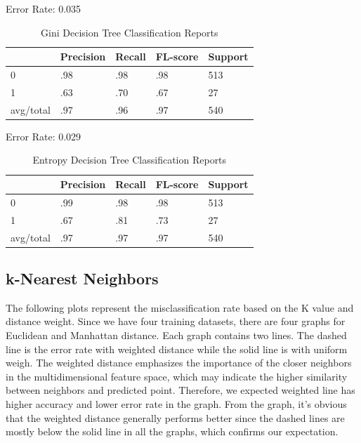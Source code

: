 \documentclass{article}
\begin{document}
\begin{table}[hbt!]
  \caption{Gini Decision Tree Classification Reports}
  Error Rate: 0.035
  \label{DT_Gini}
  \centering
  
  \begin{tabular}{lllll}
    \toprule
     & Precision & Recall & FL-score & Support\\
    \midrule
    0 & .98 & .98 & .98 & 513 \\
    1 & .63 & .70 & .67 & 27 \\
    avg/total & .97 & .96 & .97 & 540 \\
    \bottomrule
  \end{tabular}
\end{table}

\begin{table}[hbt!]
  \caption{Entropy Decision Tree Classification Reports}
  Error Rate: 0.029
  \label{DT_Entropy}
  \centering
  
  \begin{tabular}{lllll}
    \toprule
     & Precision & Recall & FL-score & Support\\
    \midrule
    0 & .99 & .98 & .98 & 513 \\
    1 & .67 & .81 & .73 & 27 \\
    avg/total & .97 & .97 & .97 & 540 \\
    \bottomrule
  \end{tabular}
\end{table}


\subsection{k-Nearest Neighbors}
The following plots represent the misclassification rate based on the K value and distance weight. Since we have four training datasets, there are four graphs for Euclidean and Manhattan distance. Each graph contains two lines. The dashed line is the error rate with weighted distance while the solid line is with uniform weigh. The weighted distance emphasizes the importance of the closer neighbors in the multidimensional feature space, which may indicate the higher similarity between neighbors and predicted point. Therefore, we expected weighted line has higher accuracy and lower error rate in the graph. From the graph, it’s obvious that the weighted distance generally performs better since the dashed lines are mostly below the solid line in all the graphs, which confirms our expectation. 
\end{document}
